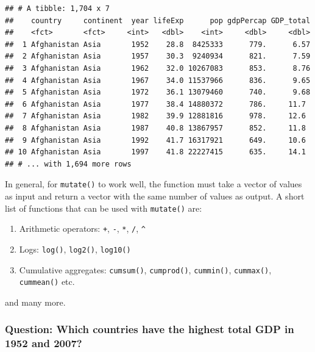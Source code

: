 \documentclass[11pt,]{article}
\newenvironment{Shaded}{\begin{snugshade}}{\end{snugshade}}
\newcommand{\KeywordTok}[1]{\textcolor[rgb]{0.13,0.29,0.53}{\textbf{#1}}}
\newcommand{\DecValTok}[1]{\textcolor[rgb]{0.00,0.00,0.81}{#1}}
\newcommand{\StringTok}[1]{\textcolor[rgb]{0.31,0.60,0.02}{#1}}
\newcommand{\OperatorTok}[1]{\textcolor[rgb]{0.81,0.36,0.00}{\textbf{#1}}}
\newcommand{\NormalTok}[1]{#1}
\providecommand{\tightlist}{%
  \setlength{\itemsep}{0pt}\setlength{\parskip}{0pt}}
\begin{document}
\begin{verbatim}
## # A tibble: 1,704 x 7
##    country     continent  year lifeExp      pop gdpPercap GDP_total
##    <fct>       <fct>     <int>   <dbl>    <int>     <dbl>     <dbl>
##  1 Afghanistan Asia       1952    28.8  8425333      779.      6.57
##  2 Afghanistan Asia       1957    30.3  9240934      821.      7.59
##  3 Afghanistan Asia       1962    32.0 10267083      853.      8.76
##  4 Afghanistan Asia       1967    34.0 11537966      836.      9.65
##  5 Afghanistan Asia       1972    36.1 13079460      740.      9.68
##  6 Afghanistan Asia       1977    38.4 14880372      786.     11.7 
##  7 Afghanistan Asia       1982    39.9 12881816      978.     12.6 
##  8 Afghanistan Asia       1987    40.8 13867957      852.     11.8 
##  9 Afghanistan Asia       1992    41.7 16317921      649.     10.6 
## 10 Afghanistan Asia       1997    41.8 22227415      635.     14.1 
## # ... with 1,694 more rows
\end{verbatim}

In general, for \texttt{mutate()} to work well, the function must take a
vector of values as input and return a vector with the same number of
values as output. A short list of functions that can be used with
\texttt{mutate()} are:

\begin{enumerate}
\def\labelenumi{\arabic{enumi}.}
\tightlist
\item
  Arithmetic operators: \texttt{+}, \texttt{-}, \texttt{*}, \texttt{/},
  \texttt{\^{}}
\item
  Logs: \texttt{log()}, \texttt{log2()}, \texttt{log10()}
\item
  Cumulative aggregates: \texttt{cumsum()}, \texttt{cumprod()},
  \texttt{cummin()}, \texttt{cummax()}, \texttt{cummean()} etc.
\end{enumerate}

and many more.

\subsubsection{Question: Which countries have the highest total GDP in
1952 and
2007?}\label{question-which-countries-have-the-highest-total-gdp-in-1952-and-2007}

\begin{Shaded}
\end{Shaded}
\end{document}
